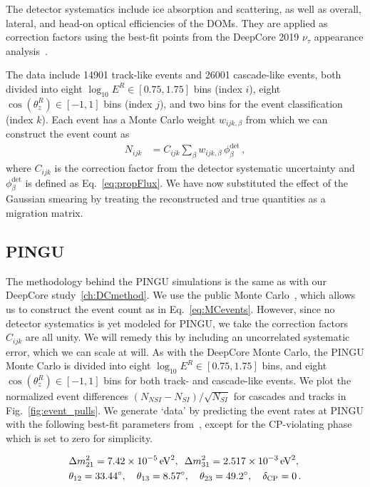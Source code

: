 \documentclass[draft=True]{revtex4-2}
\newcommand{\zreco}{\ensuremath{\cos{(\theta_z^{R})}}}
\newcommand{\Ereco}{E^{R}}
\newcommand{\dm}{\Delta m^2_{31}}
\begin{document}
The detector systematics include ice absorption and scattering, as well as overall, lateral, and head-on optical efficiencies of the DOMs. 
They are applied as correction factors using the best-fit points from the DeepCore 2019 $\nu_\tau$ appearance 
analysis~\cite{DC2019tauappearance}.

The data include 14901 track-like events and 26001 cascade-like events, both divided into eight 
$ \log_{10}\Ereco \in [0.75,1.75]$ bins (index $i$), eight $\zreco \in [-1,1]$ bins (index $j$), and two bins for the event classification (index $k$). 
Each event has a Monte Carlo weight $w_{ijk,\beta}$ from which we can construct the event count as
\begin{align}\label{eq:MCevents}
    N_{ijk} &= C_{ijk}\sum_{\beta}w_{ijk,\beta}\, \phi_\beta^\text{det}\,,
\end{align}
where $C_{ijk}$ is the correction factor from the detector systematic uncertainty and $\phi_\beta^\text{det}$ is defined as Eq.~\ref{eq:propFlux}. 
We have now substituted the effect of the Gaussian smearing by treating the reconstructed and true quantities as a migration matrix. 

\subsection{PINGU}\label{ch:PINGUmethod}
The methodology behind the PINGU simulations is the same as with our DeepCore study~\ref{ch:DCmethod}. We use the public Monte Carlo~\cite{PINGUdata}, 
which allows us to construct the event count as in Eq.~\ref{eq:MCevents}.
However, since no detector systematics is yet modeled for PINGU, we take the correction factors $C_{ijk}$ are all unity. We will remedy this by including an uncorrelated systematic error,
which we can scale at will.
As with the DeepCore Monte Carlo, the PINGU Monte Carlo is divided into eight 
$\log_{10}\Ereco \in [0.75,1.75]$ bins, and eight $\zreco \in [-1,1]$ bins for both track- and cascade-like events. 
We plot the normalized event differences $(N_{NSI} - N_{SI})/\sqrt{N_{SI}}$ for cascades and tracks in Fig.~\ref{fig:event_pulls}. %
We generate `data' by predicting the event rates at PINGU with the following best-fit parameters from~\cite{nufit}, except for the CP-violating phase which is set to zero for simplicity.

\begin{align}\label{eq:PINGUparams}
    &\Delta m^2_{21} =  \SI{7.42e-5}{\electronvolt^2},\hspace{0.5em} \dm =  \SI{2.517e-3}{\electronvolt^2}, \nonumber \\
    &\theta_{12} = \SI{33.44}{\degree},\hspace{1em} \theta_{13} = \SI{8.57}{\degree},\hspace{1em} \theta_{23} = \SI{49.2}{\degree}, \hspace{1em} \delta_\text{CP} = 0\,.
\end{align}
\end{document}
